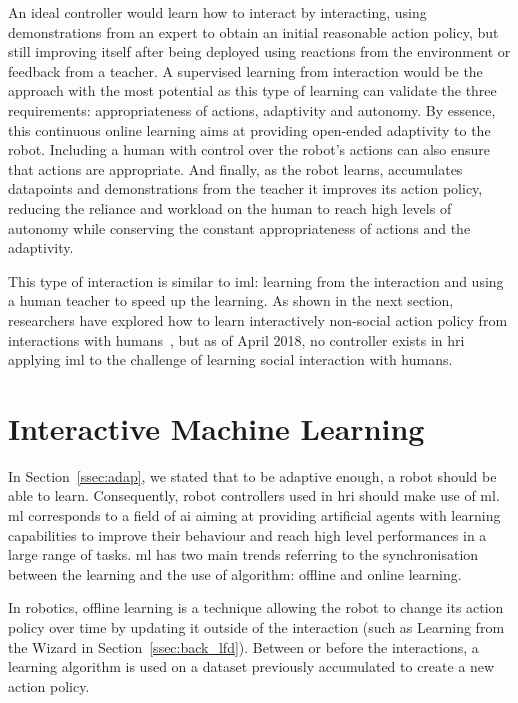  An ideal controller would learn how to interact by interacting, using demonstrations from an expert to obtain an initial reasonable action policy, but still improving itself after being deployed using reactions from the environment or feedback from a teacher. A supervised learning from interaction would be the approach with the most potential as this type of learning can validate the three requirements: appropriateness of actions, adaptivity and autonomy. By essence, this continuous online learning aims at providing open-ended adaptivity to the robot. Including a human with control over the robot's actions can also ensure that actions are appropriate. And finally, as the robot learns, accumulates datapoints and demonstrations from the teacher it improves its action policy, reducing the reliance and workload on the human to reach high levels of autonomy while conserving the constant appropriateness of actions and the adaptivity. 

 This type of interaction is similar to \gls{iml}: learning from the interaction and using a human teacher to speed up the learning. As shown in the next section, researchers have explored how to learn interactively non-social action policy from interactions with humans~\citep{scheutz2017spoken,cakmak2010designing}, but as of April 2018, no controller exists in \gls{hri} applying \gls{iml} to the challenge of learning social interaction with humans.
  
\section{Interactive Machine Learning} \label{sec:back_iml}

In Section~\ref{ssec:adap}, we stated that to be adaptive enough, a robot should be able to learn. Consequently, robot controllers used in \gls{hri} should make use of \acrfull{ml}. 
\gls{ml} corresponds to a field of \gls{ai} aiming at providing artificial agents with learning capabilities to improve their behaviour and reach high level performances in a large range of tasks. \gls{ml} has two main trends referring to the synchronisation between the learning and the use of algorithm: offline and online learning.

In robotics, offline learning is a technique allowing the robot to change its action policy over time by updating it outside of the interaction (such as Learning from the Wizard in Section~\ref{ssec:back_lfd}). Between or before the interactions, a learning algorithm is used on a dataset previously accumulated to create a new action policy.

